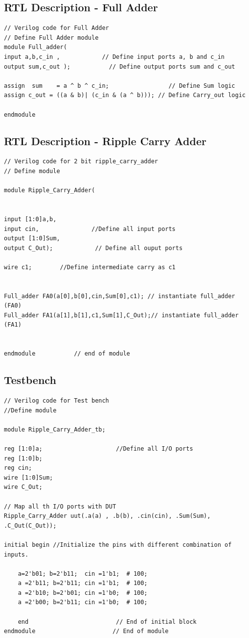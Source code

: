 \documentclass[12pt,singleside,a4paper]{article}
\begin{document}
\subsection{RTL Description - Full Adder}
\begin{lstlisting}[style=verilog-style]
// Verilog code for Full Adder
// Define Full Adder module
module Full_adder(
input a,b,c_in ,            // Define input ports a, b and c_in  
output sum,c_out );           // Define output ports sum and c_out
	
assign  sum    = a ^ b ^ c_in;                 // Define Sum logic
assign c_out = ((a & b)| (c_in & (a ^ b))); // Define Carry_out logic
	
endmodule	
\end{lstlisting}
\newpage
\subsection{RTL Description - Ripple Carry Adder}
\begin{lstlisting}[style=verilog-style]
// Verilog code for 2 bit ripple_carry_adder
// Define module

module Ripple_Carry_Adder(
	
	
input [1:0]a,b,
input cin,               //Define all input ports
output [1:0]Sum,
output C_Out);            // Define all ouput ports
	 
wire c1;		//Define intermediate carry as c1
	
	
Full_adder FA0(a[0],b[0],cin,Sum[0],c1); // instantiate full_adder (FA0)
Full_adder FA1(a[1],b[1],c1,Sum[1],C_Out);// instantiate full_adder (FA1)
	
	
endmodule	 		// end of module
\end{lstlisting}

\subsection{Testbench}
\begin{lstlisting}[style=verilog-style]
// Verilog code for Test bench
//Define module

module Ripple_Carry_Adder_tb;

reg [1:0]a;                     //Define all I/O ports 
reg [1:0]b;
reg cin;
wire [1:0]Sum;
wire C_Out;
	
// Map all th I/O ports with DUT
Ripple_Carry_Adder uut(.a(a) , .b(b), .cin(cin), .Sum(Sum), .C_Out(C_Out));
	
initial begin //Initialize the pins with different combination of inputs.
	
	a=2'b01; b=2'b11;  cin =1'b1;  # 100;
	a =2'b11; b=2'b11; cin =1'b1;  # 100;
	a =2'b10; b=2'b01; cin =1'b0;  # 100;
	a =2'b00; b=2'b11; cin =1'b0;  # 100;
	
	end                         // End of initial block
endmodule                      // End of module
\end{lstlisting}
\end{document}
